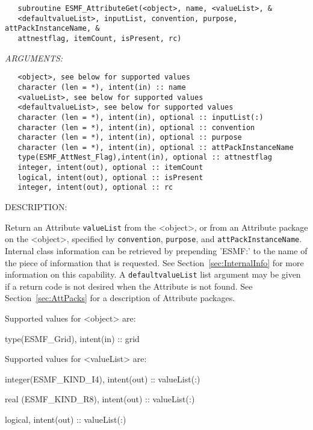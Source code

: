   
\begin{verbatim}   subroutine ESMF_AttributeGet(<object>, name, <valueList>, &
   <defaultvalueList>, inputList, convention, purpose, attPackInstanceName, &
   attnestflag, itemCount, isPresent, rc)\end{verbatim}{\em ARGUMENTS:}
\begin{verbatim}   <object>, see below for supported values
   character (len = *), intent(in) :: name
   <valueList>, see below for supported values
   <defaultvalueList>, see below for supported values
   character (len = *), intent(in), optional :: inputList(:)
   character (len = *), intent(in), optional :: convention
   character (len = *), intent(in), optional :: purpose
   character (len = *), intent(in), optional :: attPackInstanceName
   type(ESMF_AttNest_Flag),intent(in), optional :: attnestflag
   integer, intent(out), optional :: itemCount
   logical, intent(out), optional :: isPresent
   integer, intent(out), optional :: rc\end{verbatim}
{\sf DESCRIPTION:\\ }


   Return an Attribute {\tt valueList} from the <object>, or from an
   Attribute package on the <object>, specified by {\tt convention},
   {\tt purpose}, and {\tt attPackInstanceName}. Internal class
   information can be retrieved by prepending 'ESMF:'
   to the name of the piece of information that is requested. See
   Section~\ref{sec:InternalInfo} for more information
   on this capability.
   A {\tt defaultvalueList} list argument may be given if
   a return code is not desired when the Attribute is not found.
   See Section~\ref{sec:AttPacks} for a description of Attribute packages.
  
   Supported values for <object> are:
   \begin{description}
   \item type(ESMF\_Grid), intent(in) :: grid
   \end{description}
  
   Supported values for <valueList> are:
   \begin{description}
   \item integer(ESMF\_KIND\_I4), intent(out) :: valueList(:)
   \item real (ESMF\_KIND\_R8), intent(out) :: valueList(:)
   \item logical, intent(out) :: valueList(:)
   \end{description}
  
